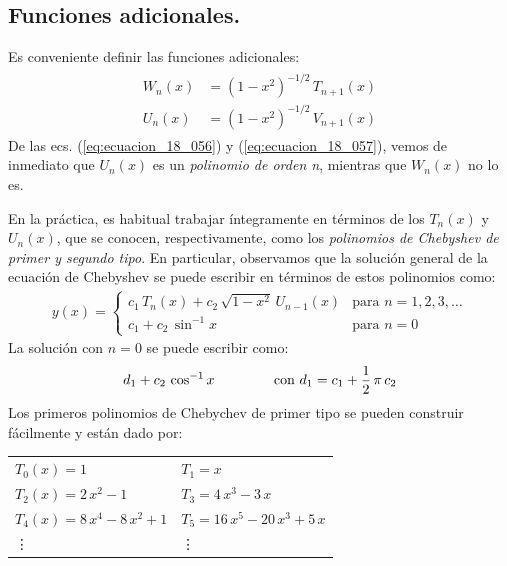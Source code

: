 \subsection{Funciones adicionales.}

Es conveniente definir las funciones adicionales:
\begin{align}
\begin{aligned}
W_{n} (x) &= (1 - x^{2})^{-1/2} \, T_{n+1} (x) \\[0.5em]
U_{n} (x) &= (1 - x^{2})^{-1/2} \, V_{n+1} (x)
\end{aligned}
\label{eq:ecuacion_18_058}
\end{align}
De las ecs. (\ref{eq:ecuacion_18_056}) y (\ref{eq:ecuacion_18_057}), vemos de inmediato que $U_{n}(x)$ es un \emph{polinomio de orden n}, mientras que $W_{n}(x)$ no lo es.
\par
En la práctica, es habitual trabajar íntegramente en términos de los $T_{n} (x)$ y $U_{n} (x)$, que se conocen, respectivamente, como los \emph{polinomios de Chebyshev de primer y segundo tipo}. En particular, observamos que la solución general de la ecuación de Chebyshev se puede escribir en términos de estos polinomios como:
\begin{align*}
y(x) = \begin{cases}
c_{1} \, T_{n} (x) + c_{2} \, \sqrt{1 -x^{2}} \, U_{n-1} (x) & \mbox{para  } n = 1, 2, 3, \ldots \\[0.5em]
c_{1} + c_{2} \, \sin^{-1} x & \mbox{para  } n = 0
\end{cases}
\end{align*}
La solución con $n = 0$ se puede escribir como:
\begin{align*}
d_{1} + c_{2} \, \cos^{-1} x \hspace{1.5cm} \mbox{con  } d_{1} = c_{1} + \dfrac{1}{2} \, \pi \, c_{2}
\end{align*}
Los primeros polinomios de Chebychev de primer tipo se pueden construir fácilmente y están dado por:
\begin{table}[H]
\centering
\fontsize{14}{14}\selectfont
\begin{tabular}{p{6cm} p{6cm}}
$T_{0}(x) = 1$ & $T_{1} = x$ \\[0.5em]
$T_{2}(x) = 2 \, x^{2} - 1$ & $T_{3} = 4 \, x^{3} - 3 \, x$ \\[0.5em]
$T_{4}(x) = 8 \, x^{4} - 8 \, x^{2} + 1$ & $T_{5} = 16 \, x^{5} - 20 \, x^{3} + 5 \, x$ \\[0.5em]
\vdots & \vdots
\end{tabular}
\end{table}
